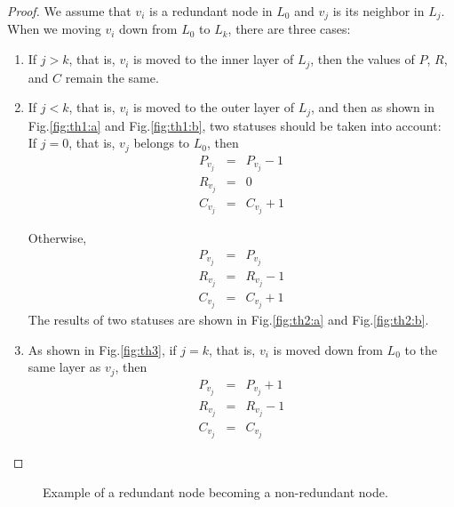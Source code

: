 \begin{proof}
	We assume that $v_i$ is a redundant node in $L_0$ and $v_j$ is its neighbor in $L_j$. When we moving $v_i$ down from $L_0$ to $L_k$, there are three cases:
	\begin{enumerate}
		\item If $j > k$, that is, $v_i$ is moved to the inner layer of $L_j$, then the values of $P$, $R$, and $C$ remain the same.
		\item If $j < k$, that is, $v_i$ is moved to the outer layer of $L_j$, and then as shown in Fig.\ref{fig:th1:a} and Fig.\ref{fig:th1:b}, two statuses should be taken into account:\\
		If $j = 0$, that is, $v_j$ belongs to $L_0$, then
		\begin{eqnarray}
		P_{v_j} &=& P_{v_j}-1\\
		R_{v_j} &=& 0\\
		C_{v_j} &=& C_{v_j}+1
		\end{eqnarray}
		
		Otherwise,
		\begin{eqnarray}
		P_{v_j} &=& P_{v_j}\\
		R_{v_j} &=& R_{v_j}-1\\
		C_{v_j} &=& C_{v_j}+1
		\end{eqnarray}
		The results of two statuses are shown in Fig.\ref{fig:th2:a} and Fig.\ref{fig:th2:b}.
		\item As shown in Fig.\ref{fig:th3}, if $j = k$, that is, $v_i$ is moved down from $L_0$ to the same layer as $v_j$, then
		\begin{eqnarray}
		P_{v_j} &=& P_{v_j}+1\\
		R_{v_j} &=& R_{v_j}-1\\
		C_{v_j} &=& C_{v_j}
\end{eqnarray}
		
\end{enumerate}
%	
\end{proof}
\begin{figure}[!htb]
	\centering
	\caption{Example of a redundant node becoming a non-redundant node.}
	\label{fig:th4}
\end{figure}
